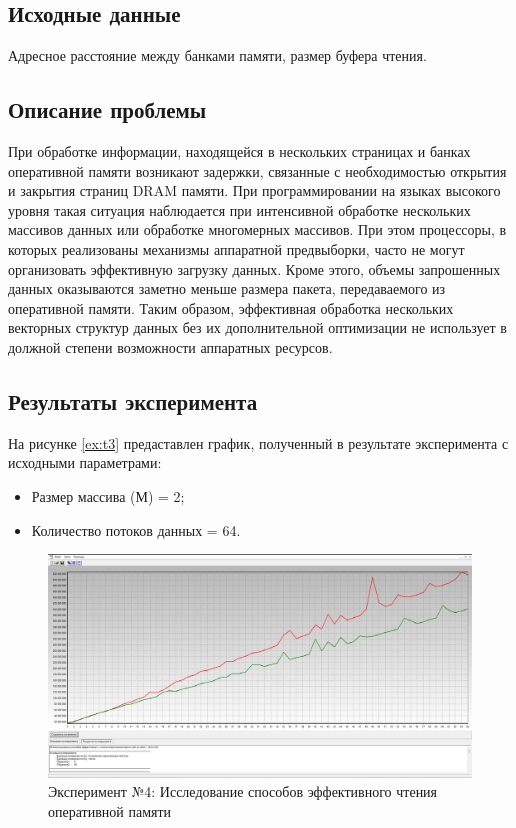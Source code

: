 \subsection*{Исходные данные}
Адресное расстояние между банками памяти, размер буфера чтения.

\subsection*{Описание проблемы}
При обработке информации, находящейся в нескольких страницах и банках оперативной памяти возникают задержки, связанные с необходимостью открытия и закрытия страниц DRAM памяти. При программировании на языках высокого уровня такая ситуация наблюдается при интенсивной обработке нескольких массивов данных или обработке многомерных массивов. При этом процессоры, в которых реализованы механизмы аппаратной предвыборки, часто не могут организовать эффективную загрузку данных. Кроме этого, объемы запрошенных данных оказываются заметно меньше размера пакета, передаваемого из оперативной памяти. Таким образом, эффективная обработка нескольких векторных структур данных без их дополнительной оптимизации не использует в должной степени возможности аппаратных ресурсов. 

\subsection*{Результаты эксперимента}
На рисунке \ref{ex:t3} предаставлен график, полученный в результате эксперимента с исходными параметрами:
\begin{itemize}
	\item Размер массива (М) = 2;
	\item Количество потоков данных = 64.
\end{itemize}

\begin{figure}[h]
	\centering
	\includegraphics[height=0.35\textheight]{img/t4}
	\caption{Эксперимент №4: Исследование способов эффективного чтения оперативной памяти}
	\label{ex:t4}
\end{figure}

